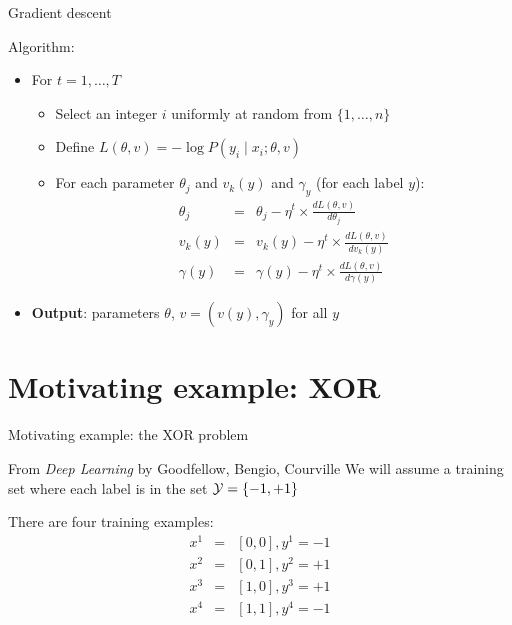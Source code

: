 \begin{frame}{Gradient descent}
\begin{block}{Algorithm:}
\begin{itemize}[<+->]
\item For $t = 1, \ldots, T$
\begin{itemize}[<+->]
\item Select an integer $i$ uniformly at random from $\{ 1, \ldots, n \}$
\item Define $L(\theta, v) = - \log P(y_i \mid x_i; \theta, v)$
\item For each parameter $\theta_j$ and $v_k(y)$ and $\gamma_y$ (for each label $y$):
\begin{eqnarray*}
\theta_j &=& \theta_j - \eta^t \times \frac{dL(\theta,v)}{d\theta_j} \\
v_k(y) &=& v_k(y) - \eta^t \times \frac{dL(\theta,v)}{d v_k(y)} \\
\gamma(y) &=& \gamma(y) - \eta^t \times \frac{dL(\theta,v)}{d \gamma(y)}
\end{eqnarray*}
\end{itemize}
\item \textbf{Output}: parameters $\theta$, $v = (v(y), \gamma_y)$ for all $y$
\end{itemize}
\end{block}
\end{frame}

\section{Motivating example: XOR}
\frame{\tableofcontents[currentsection]}

\begin{frame}{Motivating example: the XOR problem}
\begin{block}{From \textit{Deep Learning} by Goodfellow, Bengio, Courville}
We will assume a training set where each label is in the set ${\cal Y} = \{ -1, +1 \}$

There are four training examples:
\begin{eqnarray*}
x^1 &=& [0,0], y^1 = -1\\
x^2 &=& [0,1], y^2 = +1 \\
x^3 &=& [1,0], y^3 = +1\\
x^4 &=& [1,1], y^4 = -1
\end{eqnarray*}
\end{block}
\end{frame}

